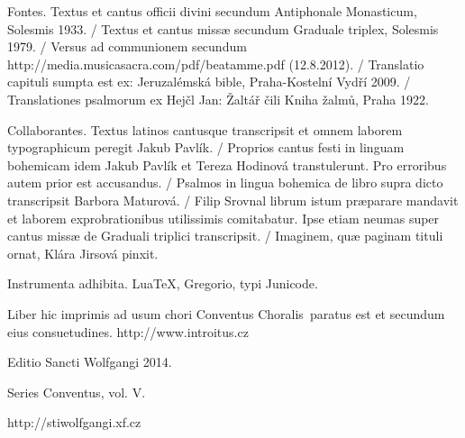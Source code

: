 \documentclass[a4paper, twoside, 12pt]{article}
\newcommand{\annusEditionis}{2014}
\begin{document}
\mbox{} %
\newpage %


\vspace*{5cm}

Fontes.
Textus et cantus officii divini secundum
Antiphonale Monasticum, Solesmis 1933. /
Textus et cantus missæ secundum
Graduale triplex, Solesmis 1979. /
Versus ad communionem secundum
http://media.musicasacra.com/pdf/beatamme.pdf (12.8.2012). /
Translatio capituli sumpta est ex:
Jeruzalémská bible, Praha-Kostelní Vydří 2009. /
Translationes psalmorum ex
Hejčl Jan: Žaltář čili Kniha žalmů, Praha 1922.

Collaborantes.
Textus latinos cantusque transcripsit et omnem laborem typographicum peregit
Jakub Pavlík. /
Proprios cantus festi in linguam bohemicam idem Jakub Pavlík et Tereza Hodinová
transtulerunt. Pro erroribus autem prior est accusandus. /
Psalmos in lingua bohemica de libro supra dicto transcripsit
Barbora Maturová. /
Filip Srovnal librum istum præparare mandavit et laborem exprobrationibus
utilissimis comitabatur. Ipse etiam neumas super cantus missæ
de Graduali triplici transcripsit. /
Imaginem, quæ paginam tituli ornat, Klára Jirsová pinxit.

Instrumenta adhibita.
LuaTeX, %
Gregorio, %
typi Junicode. %

\begin{center}
Liber hic imprimis ad usum chori
\guillemotright Conventus Choralis\guillemotleft\
paratus est
et secundum eius consuetudines.
http://www.introitus.cz

\vspace{1cm}

{\large Editio Sancti Wolfgangi \annusEditionis.}

\vspace{2mm}

Series \guillemotright Conventus\guillemotleft, vol. V.

\vspace{1cm}

http://stiwolfgangi.xf.cz

\end{center}

\vfill
\end{document}

